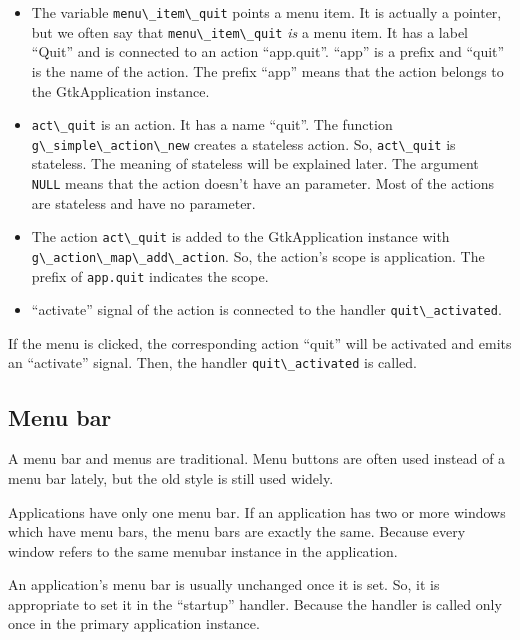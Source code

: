 \begin{itemize}
\tightlist
\item
  The variable \passthrough{\lstinline!menu\_item\_quit!} points a menu
  item. It is actually a pointer, but we often say that
  \passthrough{\lstinline!menu\_item\_quit!} \emph{is} a menu item. It
  has a label ``Quit'' and is connected to an action ``app.quit''.
  ``app'' is a prefix and ``quit'' is the name of the action. The prefix
  ``app'' means that the action belongs to the GtkApplication instance.
\item
  \passthrough{\lstinline!act\_quit!} is an action. It has a name
  ``quit''. The function
  \passthrough{\lstinline!g\_simple\_action\_new!} creates a stateless
  action. So, \passthrough{\lstinline!act\_quit!} is stateless. The
  meaning of stateless will be explained later. The argument
  \passthrough{\lstinline!NULL!} means that the action doesn't have an
  parameter. Most of the actions are stateless and have no parameter.
\item
  The action \passthrough{\lstinline!act\_quit!} is added to the
  GtkApplication instance with
  \passthrough{\lstinline!g\_action\_map\_add\_action!}. So, the
  action's scope is application. The prefix of
  \passthrough{\lstinline!app.quit!} indicates the scope.
\item
  ``activate'' signal of the action is connected to the handler
  \passthrough{\lstinline!quit\_activated!}.
\end{itemize}

If the menu is clicked, the corresponding action ``quit'' will be
activated and emits an ``activate'' signal. Then, the handler
\passthrough{\lstinline!quit\_activated!} is called.

\subsection{Menu bar}\label{menu-bar}

A menu bar and menus are traditional. Menu buttons are often used
instead of a menu bar lately, but the old style is still used widely.

Applications have only one menu bar. If an application has two or more
windows which have menu bars, the menu bars are exactly the same.
Because every window refers to the same menubar instance in the
application.

An application's menu bar is usually unchanged once it is set. So, it is
appropriate to set it in the ``startup'' handler. Because the handler is
called only once in the primary application instance.

